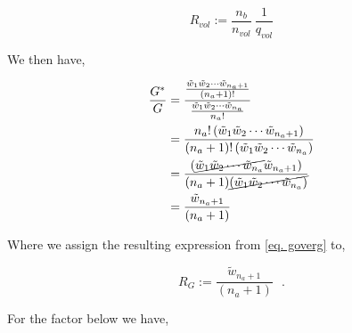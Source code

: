\documentclass[12pt,letterpaper]{article}
\newcommand{\lr}[1]{\left( #1 \right)}
\begin{document}
\begin{equation}
    R_{vol}:=
    		\frac{
		    n_b
		}{
		    n_{vol} 
		}
		~
    \frac{
    1
}{
    q_{vol}
}
   \label{Rvol}
\end{equation}

We then have,

\begin{align}
\label{eq. goverg}
\frac{
    G^{*}
}{
    G
}
&=
\frac{
    \frac{
        \tilde{w}_1
        \tilde{w}_2
        \cdots 
        \tilde{w}_{n_a+1}
    }{
        (n_a+1)!
    }   
}{   
    \frac{
        \tilde{w}_1
        \tilde{w}_2
        \cdots 
        \tilde{w}_{n_a}
    }{
        n_a!
    }   
}\nonumber\\
&=
\frac{
        n_a!
        \lr{
            \tilde{w}_1
            \tilde{w}_2
            \cdots 
            \tilde{w}_{n_a+1}
        }       
}{ 
        (n_a+1)!
        \lr{
            \tilde{w}_1
            \tilde{w}_2
            \cdots 
            \tilde{w}_{n_a}
            }
}\\
&=
\frac{
        \lr{
            \cancel{
                \tilde{w}_1
                \tilde{w}_2
                \cdots 
                \tilde{w}_{n_a}
            }
            \tilde{w}_{n_a+1}
        }       
}{ 
        (n_a+1)
        \cancel{
            \lr{
                \tilde{w}_1
                \tilde{w}_2
                \cdots 
                \tilde{w}_{n_a}
                }
        }
}\nonumber\\
&=
\frac{
            \tilde{w}_{n_a+1}       
}{ 
        (n_a+1)
}\nonumber
\end{align}

Where we assign the resulting expression from \ref{eq. goverg} to,

\begin{equation}
    R_{G}:=
    \frac{
                \tilde{w}_{n_a+1}       
    }{ 
            (n_a+1)
    }~~~\textbf{.}
   \label{Eq: RG}
\end{equation}

For the factor below we have, 
\end{document}
